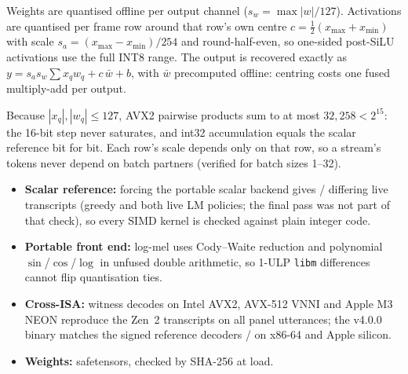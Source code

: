 \documentclass[letterpaper]{article}
\begin{document}
\noindent
\begin{minipage}[t]{0.486\textwidth}
  \vspace{0pt}
  {\fontsize{8.4}{10.6}\selectfont
  Weights are quantised offline per output channel ($s_w=\max|w|/127$). Activations are quantised per frame row around that row's own centre $c=\tfrac12(x_{\max}+x_{\min})$ with scale $s_a=(x_{\max}-x_{\min})/254$ and round-half-even, so one-sided post-SiLU activations use the full INT8 range. The output is recovered exactly as $y = s_a s_w\sum x_q w_q + c\,\bar w + b$, with $\bar w$ precomputed offline: centring costs one fused multiply-add per output.

  \vspace{2.5pt}
  Because $|x_q|,|w_q|\le127$, AVX2 pairwise products sum to at most $32{,}258<2^{15}$: the 16-bit step never saturates, and int32 accumulation equals the scalar reference bit for bit. Each row's scale depends only on that row, so a stream's tokens never depend on batch partners (verified for batch sizes 1--32).
  }
\end{minipage}\hfill
\begin{minipage}[t]{0.486\textwidth}
  \vspace{0pt}
  {\fontsize{8.4}{10.6}\selectfont
  \begin{itemize}[leftmargin=1.12em,itemsep=1.5pt,topsep=1pt]
    \item \textbf{Scalar reference:} forcing the portable scalar backend gives \ScalarDiffs/\ScalarUtts{} differing live transcripts (greedy and both live LM policies; the final pass was not part of that check), so every SIMD kernel is checked against plain integer code.
    \item \textbf{Portable front end:} log-mel uses Cody--Waite reduction and polynomial $\sin$/$\cos$/$\log$ in unfused double arithmetic, so 1-ULP \texttt{libm} differences cannot flip quantisation ties.
    \item \textbf{Cross-ISA:} \CandIsaRuns{} witness decodes on Intel AVX2, AVX-512 VNNI and Apple M3 NEON reproduce the Zen~2 transcripts on all \ScalarUtts{} panel utterances; the v4.0.0 binary matches the signed reference decoders \ScalarUtts/\ScalarUtts{} on x86-64 and Apple silicon.
    \item \textbf{Weights:} safetensors, checked by SHA-256 at load.
  \end{itemize}
  }
\end{minipage}
\end{document}
